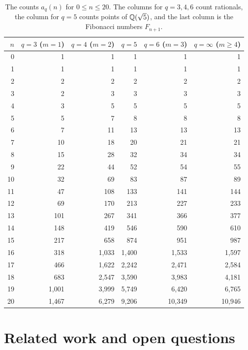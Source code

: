 \begin{table}[ht]
\centering\small
\begin{tabular}{@{}r r r r r r@{}}
\toprule
$n$ & $q=3$ ($m=1$) & $q=4$ ($m=2$) & $q=5$ & $q=6$ ($m=3$) & $q=\infty$ ($m\ge4$)\\
\midrule
0 & 1 & 1 & 1 & 1 & 1\\
1 & 1 & 1 & 1 & 1 & 1\\
2 & 2 & 2 & 2 & 2 & 2\\
3 & 2 & 3 & 3 & 3 & 3\\
4 & 3 & 5 & 5 & 5 & 5\\
5 & 5 & 7 & 8 & 8 & 8\\
6 & 7 & 11 & 13 & 13 & 13\\
7 & 10 & 18 & 20 & 21 & 21\\
8 & 15 & 28 & 32 & 34 & 34\\
9 & 22 & 44 & 52 & 54 & 55\\
10 & 32 & 69 & 83 & 87 & 89\\
11 & 47 & 108 & 133 & 141 & 144\\
12 & 69 & 170 & 213 & 227 & 233\\
13 & 101 & 267 & 341 & 366 & 377\\
14 & 148 & 419 & 546 & 590 & 610\\
15 & 217 & 658 & 874 & 951 & 987\\
16 & 318 & 1{,}033 & 1{,}400 & 1{,}533 & 1{,}597\\
17 & 466 & 1{,}622 & 2{,}242 & 2{,}471 & 2{,}584\\
18 & 683 & 2{,}547 & 3{,}590 & 3{,}983 & 4{,}181\\
19 & 1{,}001 & 3{,}999 & 5{,}749 & 6{,}420 & 6{,}765\\
20 & 1{,}467 & 6{,}279 & 9{,}206 & 10{,}349 & 10{,}946\\
\bottomrule
\end{tabular}
\caption{The counts $a_q(n)$ for $0\le n\le20$. The columns for $q=3,4,6$ count rationals, the column
for $q=5$ counts points of $\mathbb{Q}(\sqrt5)$, and the last column is the Fibonacci numbers $F_{n+1}$.}
\label{tab:counts}
\end{table}

\section{Related work and open questions}\label{sec:final}

